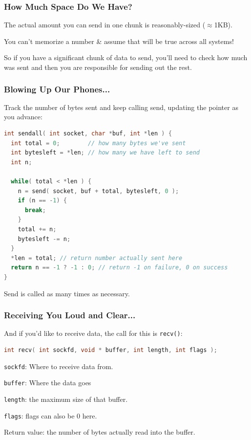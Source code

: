 \begin{frame}
\frametitle{How Much Space Do We Have?}

The actual amount you can send in one chunk is reasonably-sized ($\approx$1KB). 

You can't memorize a number \& assume that will be true across all systems! 

So if you have a significant chunk of data to send, you'll need to check how much was sent and then you are responsible for sending out the rest.

\end{frame}



\begin{frame}[fragile]
\frametitle{Blowing Up Our Phones...}

Track the number of bytes sent and keep calling send, updating the pointer as you advance:

\begin{lstlisting}[language=C]
int sendall( int socket, char *buf, int *len ) {
  int total = 0;        // how many bytes we've sent
  int bytesleft = *len; // how many we have left to send
  int n;

  while( total < *len ) {
    n = send( socket, buf + total, bytesleft, 0 );
    if (n == -1) { 
      break; 
    }
    total += n;
    bytesleft -= n;
  }
  *len = total; // return number actually sent here
  return n == -1 ? -1 : 0; // return -1 on failure, 0 on success
}
\end{lstlisting}

Send is called as many times as necessary.

\end{frame}



\begin{frame}[fragile]
\frametitle{Receiving You Loud and Clear...}

And if you'd like to receive data, the call for this is \texttt{recv()}:

\begin{lstlisting}[language=C]
int recv( int sockfd, void * buffer, int length, int flags );
\end{lstlisting}

\texttt{sockfd}: Where to receive data from. 

\texttt{buffer}: Where the data goes

\texttt{length}: the maximum size of that buffer. 

\texttt{flags}: flags can also be 0 here. 

Return value: the number of bytes actually read into the buffer.

\end{frame}

